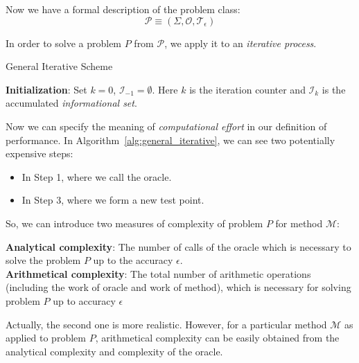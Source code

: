 Now we have a formal description of the problem class:
\[
    \mathscr{P} \equiv (\Sigma, \mathcal{O}, \mathscr{T}_\epsilon)    
\]

In order to solve a problem \(P\) from \(\mathscr{P}\), we apply it to an \emph{iterative process}.
\begin{algorithm}[!htbp]
    \caption{General Iterative Scheme}\label{alg:general_iterative}
    \textbf{Initialization}: Set \(k = 0\), \(\mathscr{I}_{-1} = \emptyset\). Here \(k\) is the iteration counter and \(\mathscr{I}_k\) is the accumulated \emph{informational set}.\\
\end{algorithm}

Now we can specify the meaning of \emph{computational effort} in our definition of performance. In Algorithm~\ref{alg:general_iterative}, we can see two potentially expensive steps:
\begin{itemize}
    \item In Step 1, where we call the oracle.
    \item In Step 3, where we form a new test point.
\end{itemize}
So, we can introduce two measures of complexity of problem \(P\) for method \(\mathscr{M}\):
\newpage
\begin{defn}\label{defn:complexity}
\textbf{{Analytical complexity}}: The number of calls of the oracle which is necessary to solve the problem \(P\) up to the accuracy \(\epsilon\).\\
\textbf{{Arithmetical complexity}}: The total number of arithmetic operations (including the work of oracle and work of method), which is necessary for solving problem \(P\) up to accuracy \(\epsilon\)
\end{defn}

Actually, the second one is more realistic. However, for a particular method \(\mathscr{M}\) as applied to problem \(P\), arithmetical complexity can be easily obtained from the analytical complexity and complexity of the oracle.

